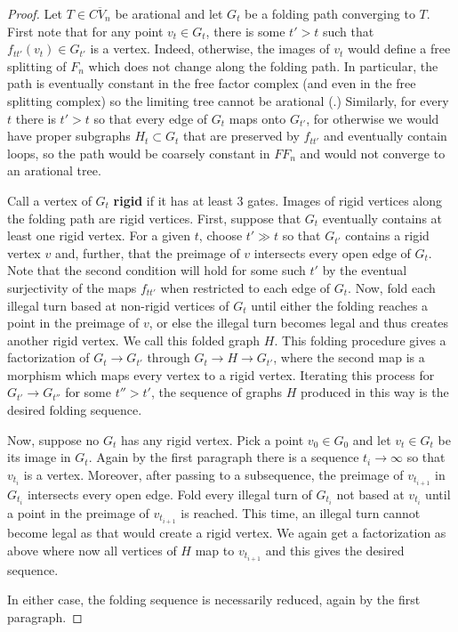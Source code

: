 \documentclass[11pt, letterpaper]{amsart}
\theoremstyle{plain}
\theoremstyle{definition}
\begin{document}
\begin{proof}
  Let $T\in \overline{CV_n}$ be arational and let $G_t$ be a folding path
  converging to $T$.
  First note that for any point $v_t\in G_t$, there is some $t'>t$ such
  that $f_{tt'}(v_t)\in G_{t'}$ is a vertex. Indeed, otherwise, the
  images of $v_t$ would define a free splitting of $F_n$ which does not
  change along the folding path. In particular, the path is eventually
  constant in the free factor complex (and even in the free splitting
  complex) so the limiting tree cannot be arational (\cite[Corollary
  4.5]{bestvina2015boundary}.) 
   Similarly, for every $t$ there is $t'>t$ so that every edge of $G_t$ maps onto $G_{t'}$, for otherwise we would have
  proper subgraphs $H_t\subset G_t$ that are preserved by $f_{tt'}$
  and eventually contain loops, so the path would be coarsely constant
  in $FF_n$ and would not converge to an arational tree.  

  Call a vertex of $G_t$ \textbf{rigid} if it has at least 3
  gates. Images of rigid vertices along the folding path are rigid
  vertices. First, suppose that $G_t$ eventually contains at least one
  rigid vertex. For a given $t$, choose $t'\gg t$ so that $G_{t'}$ contains
  a rigid vertex $v$ and, further, that the preimage of $v$ intersects every open edge of
  $G_t$. Note that the second condition will hold for some such $t'$
  by the eventual surjectivity of the maps $f_{tt'}$ when restricted
  to each edge of $G_t$. 
  Now,
  fold each illegal turn 
  based at non-rigid vertices of $G_t$ until
  either the folding reaches a point in the preimage of $v$, or else the illegal turn
  becomes legal and thus creates another rigid vertex. We call this folded graph
  $H$. 
  This folding procedure gives a factorization of 
   $G_t\to G_{t'}$ through $G_t\to H\to G_{t'}$, where the
  second map is a morphism which maps every vertex to
  a rigid vertex. Iterating this process for $G_{t'} \to G_{t''}$ for some $t''>t'$, the sequence of graphs $H$ produced in
  this way is the desired folding sequence.

  Now, suppose no $G_t$ has any rigid vertex. Pick a point $v_0\in
  G_0$ and let $v_t\in G_t$ be its image in $G_t$. Again by the first
  paragraph there is a sequence $t_i\to\infty$ so that $v_{t_i}$ is a
  vertex. Moreover, after passing to a subsequence, the preimage of $v_{t_{i+1}}$
  in $G_{t_i}$ intersects every open edge. Fold every illegal turn of
  $G_{t_i}$ not
  based at $v_{t_i}$ until a point in the preimage of $v_{t_{i+1}}$ is reached. This time, an
  illegal turn cannot become legal as that would create a rigid
  vertex. We again get a factorization as above where now all vertices
  of $H$ map to $v_{t_{i+1}}$ and this gives the desired sequence.

  In either case, the folding sequence is necessarily reduced, again by the first
  paragraph. 
\end{proof}
\end{document}
